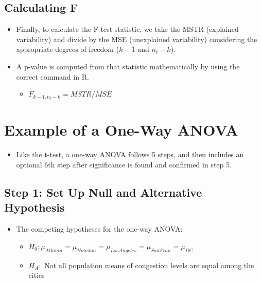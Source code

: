 \documentclass[
  letterpaper,
  DIV=11,
  numbers=noendperiod]{scrreprt}
\providecommand{\tightlist}{%
  \setlength{\itemsep}{0pt}\setlength{\parskip}{0pt}}\usepackage{longtable,booktabs,array}
\begin{document}
\subsection{Calculating F}\label{calculating-f}

\begin{itemize}
\tightlist
\item
  Finally, to calculate the F-test statistic, we take the MSTR
  (explained variability) and divide by the MSE (unexplained
  variability) considering the appropriate degrees of freedom (\(k-1\)
  and \(n_t-k\)).
\item
  A p-value is computed from that statistic mathematically by using the
  correct command in R.

  \begin{itemize}
  \tightlist
  \item
    \(F_{k-1,n_t-k} = MSTR/MSE\)
  \end{itemize}
\end{itemize}

\section{Example of a One-Way ANOVA}\label{example-of-a-one-way-anova}

\begin{itemize}
\tightlist
\item
  Like the t-test, a one-way ANOVA follows 5 steps, and then includes an
  optional 6th step after significance is found and confirmed in step 5.
\end{itemize}

\subsection{Step 1: Set Up Null and Alternative
Hypothesis}\label{step-1-set-up-null-and-alternative-hypothesis}

\begin{itemize}
\tightlist
\item
  The competing hypotheses for the one-way ANOVA:

  \begin{itemize}
  \tightlist
  \item
    \(H_0: \mu_{Atlanta} = \mu_{Houston}= \mu_{LosAngeles} = \mu_{SanFran} = \mu_{DC}\)
  \item
    \(H_A:\) Not all population means of congestion levels are equal
    among the cities
  \end{itemize}
\end{itemize}
\end{document}
